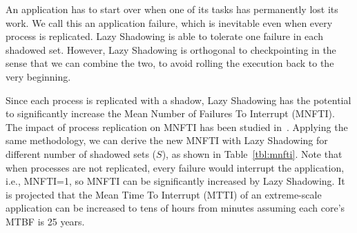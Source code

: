 An application has to start over when one of its tasks has permanently lost its work. We call this an application failure, which is inevitable even when every process is replicated. Lazy Shadowing is able to 
tolerate one failure in each shadowed set. %
However, Lazy Shadowing is orthogonal to checkpointing in 
the sense that we can combine the two, to avoid rolling the execution back to the very beginning. 

Since each process is replicated with a shadow, Lazy Shadowing has the potential to significantly 
increase the Mean Number of Failures To Interrupt (MNFTI). %
The impact of process replication on MNFTI has been studied in~\cite{casanova_inria_2012}. %
Applying the same methodology, we can derive the new MNFTI
with Lazy Shadowing for different number of shadowed sets ($S$), as shown in Table~\ref{tbl:mnfti}. 
Note that when processes are not replicated, every failure would interrupt the application, i.e., MNFTI=1, so MNFTI can be significantly increased by Lazy Shadowing. 
It is projected that the Mean Time To Interrupt (MTTI) of an extreme-scale application can be increased to tens of hours from minutes assuming each core's MTBF is 25 years.
